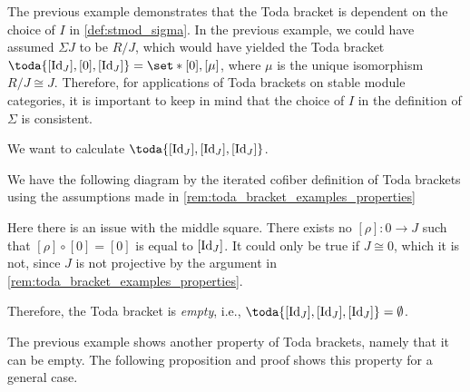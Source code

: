 The previous example demonstrates that the Toda bracket is dependent on the choice of \( I \) in \autoref{def:stmod_sigma}. In the previous example, we could have assumed \( \Sigma J \) to be \( R/J \), which would have yielded the Toda bracket \( \toda{[\Id_J], [0], [\Id_J]} = \set*{[0], [\mu]} \), where \( \mu \) is the unique isomorphism \( R/J \cong J \). Therefore, for applications of Toda brackets on stable module categories, it is important to keep in mind that the choice of \( I \) in the definition of \( \Sigma \) is consistent.

\begin{example}
	\label{ex:toda_bracket_2}
	We want to calculate \( \toda{[\Id_J], [\Id_J], [\Id_J]} \).

	We have the following diagram by the iterated cofiber definition of Toda brackets using the assumptions made in \autoref{rem:toda_bracket_examples_properties}
	\begin{center}
	\end{center}

	Here there is an issue with the middle square. There exists no \( [\rho]: 0 \to J \) such that \( [\rho] \circ [0] = [0] \) is equal to \( [\operatorname{Id}_J] \). It could only be true if \( J \cong 0 \), which it is not, since \( J \) is not projective by the argument in \autoref{rem:toda_bracket_examples_properties}.

	Therefore, the Toda bracket is \emph{empty}, i.e., \( \toda{[\Id_J], [\Id_J], [\Id_J]} = \emptyset \).
\end{example}

The previous example shows another property of Toda brackets, namely that it can be empty. The following proposition and proof shows this property for a general case.

